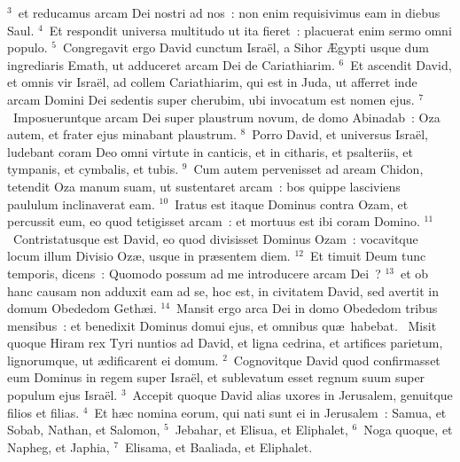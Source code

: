 ${}^{3}$~et reducamus arcam Dei nostri ad nos~: non enim requisivimus eam in diebus Saul.
${}^{4}$~Et respondit universa multitudo ut ita fieret~: placuerat enim sermo omni populo.
${}^{5}$~Congregavit ergo David cunctum Isra\"el, a Sihor \AE gypti usque dum ingrediaris Emath, ut adduceret arcam Dei de Cariathiarim.
${}^{6}$~Et ascendit David, et omnis vir Isra\"el, ad collem Cariathiarim, qui est in Juda, ut afferret inde arcam Domini Dei sedentis super cherubim, ubi invocatum est nomen ejus.
${}^{7}$~Imposueruntque arcam Dei super plaustrum novum, de domo Abinadab~: Oza autem, et frater ejus minabant plaustrum.
${}^{8}$~Porro David, et universus Isra\"el, ludebant coram Deo omni virtute in canticis, et in citharis, et psalteriis, et tympanis, et cymbalis, et tubis.
${}^{9}$~Cum autem pervenisset ad aream Chidon, tetendit Oza manum suam, ut sustentaret arcam~: bos quippe lasciviens paululum inclinaverat eam.
${}^{10}$~Iratus est itaque Dominus contra Ozam, et percussit eum, eo quod tetigisset arcam~: et mortuus est ibi coram Domino.
${}^{11}$~Contristatusque est David, eo quod divisisset Dominus Ozam~: vocavitque locum illum Divisio Oz\ae , usque in pr\ae sentem diem.
${}^{12}$~Et timuit Deum tunc temporis, dicens~: Quomodo possum ad me introducere arcam Dei~?
${}^{13}$~et ob hanc causam non adduxit eam ad se, hoc est, in civitatem David, sed avertit in domum Obededom Geth\ae i.
${}^{14}$~Mansit ergo arca Dei in domo Obededom tribus mensibus~: et benedixit Dominus domui ejus, et omnibus qu\ae\ habebat.
~\lettrine[lines=10,image=true,loversize=0.05,lraise=-0.03]{M}{}isit quoque Hiram rex Tyri nuntios ad David, et ligna cedrina, et artifices parietum, lignorumque, ut \ae dificarent ei domum.
${}^{2}$~Cognovitque David quod confirmasset eum Dominus in regem super Isra\"el, et sublevatum esset regnum suum super populum ejus Isra\"el.
${}^{3}$~Accepit quoque David alias uxores in Jerusalem, genuitque filios et filias.
${}^{4}$~Et h\ae c nomina eorum, qui nati sunt ei in Jerusalem~: Samua, et Sobab, Nathan, et Salomon,
${}^{5}$~Jebahar, et Elisua, et Eliphalet,
${}^{6}$~Noga quoque, et Napheg, et Japhia,
${}^{7}$~Elisama, et Baaliada, et Eliphalet.


